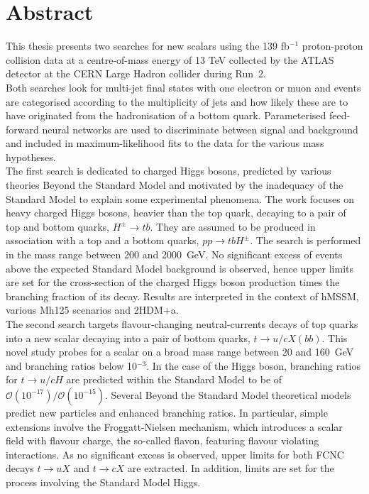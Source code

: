 \chapter*{Abstract}


This thesis presents two searches for new scalars using the 139 fb$^{-1}$ proton-proton collision data at a centre-of-mass energy of 13 TeV collected by the ATLAS detector at the CERN Large Hadron collider during Run~2.\\

Both searches look for multi-jet final states with one electron or muon and events are categorised according to the multiplicity of jets and how likely these are to have originated from the hadronisation of a bottom quark. Parameterised feed-forward neural networks are used to discriminate between signal and background and included in maximum-likelihood fits to the data for the various mass hypotheses.\\

The first search is dedicated to charged Higgs bosons, predicted by various theories Beyond the Standard Model and motivated by the inadequacy of the Standard Model to explain some experimental phenomena. The work focuses on heavy charged Higgs bosons, heavier than the top quark, decaying to a pair of top and bottom quarks, $H^\pm\to tb$. They are assumed to be produced in association with a top and a bottom quarks, $pp\to tbH^\pm$. The search is performed in the mass range between 200 and 2000~GeV. No significant excess of events above the expected Standard Model background is observed, hence upper limits are set for the cross-section of the charged Higgs boson production times the branching fraction of its decay. Results are interpreted in the context of hMSSM, various Mh125 scenarios and 2HDM+a.\\

The second search targets flavour-changing neutral-currents decays of top quarks into a new scalar decaying into a pair of bottom quarks, $t \to u/c X(bb)$. This novel study probes for a scalar on a broad mass range between 20 and 160~GeV and branching ratios below 10$^{-3}$. In the case of the Higgs boson, branching ratios for $t \to u/c H$ are predicted within the Standard Model to be of $\mathcal{O}(10^{-17})/\mathcal{O}(10^{-15})$. Several Beyond the Standard Model theoretical models predict new particles and enhanced branching ratios. In particular, simple extensions involve the Froggatt-Nielsen mechanism, which introduces a scalar field with flavour charge, the so-called flavon, featuring flavour violating interactions. As no significant excess is observed, upper limits for both FCNC decays $t\to uX$ and $t\to cX$ are extracted. In addition, limits are set for the process involving the Standard Model Higgs.
